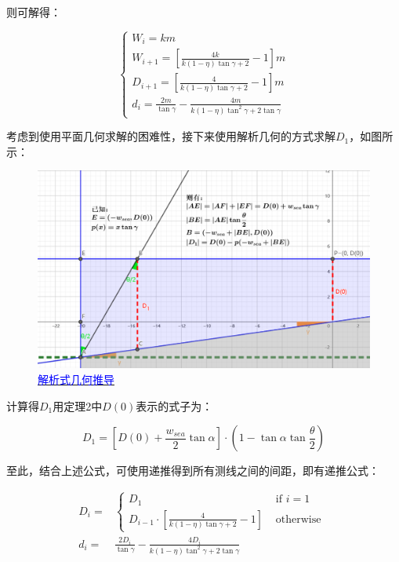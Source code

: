 则可解得：

\begin{equation}
    \begin{cases}
        W_i = km\\
        W_{i + 1} = \left[\frac{4k}{k(1 - \eta) \tan \gamma + 2} - 1\right]m\\
        D_{i + 1} = \left[\frac{4}{k(1 - \eta) \tan \gamma + 2} - 1\right]m\\
        d_i = \frac{2m}{\tan \gamma} - \frac{4m}{k(1-\eta) \tan^2 \gamma + 2 \tan \gamma}
    \end{cases}
\end{equation}

考虑到使用平面几何求解的困难性，接下来使用解析几何的方式求解$D_1$，如图所示：

\begin{figure}[h]   
    \centering
    \includegraphics[scale=0.3]{res/img/解析式几何推导.png}
    \caption{\href{https://www.geogebra.org/m/ycxg4tw9}{\textcolor{blue}{解析式几何推导}}}
    \label{fig:解析式几何推导}
\end{figure}

计算得$D_1$用定理2中$D(0)$表示的式子为：

\begin{equation}
    D_1 = \left[ D(0) + \frac{w_{sea}}{2} \tan \alpha \right] \cdot \left( 1 - \tan \alpha \tan \frac{\theta}{2} \right)
\end{equation}

至此，结合上述公式，可使用递推得到所有测线之间的间距，即有递推公式：

\begin{align}
    D_{i} = & \begin{cases}
        D_1 & \text{ if } i = 1 \\
        D_{i - 1} \cdot \left[\frac{4}{k(1 - \eta) \tan \gamma + 2} - 1\right] & \text{ otherwise }
    \end{cases}\\
    d_i = & \frac{2D_i}{\tan \gamma} - \frac{4D_i}{k(1-\eta) \tan^2 \gamma + 2 \tan \gamma}
\end{align}


